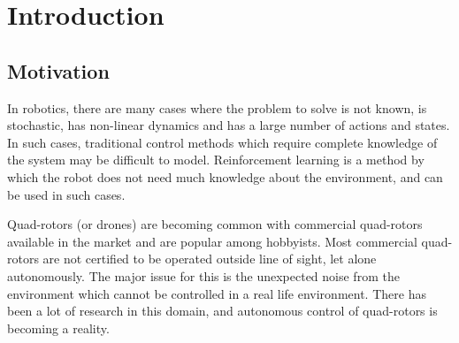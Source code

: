 \documentclass[BTech]{iitmdiss}
\begin{document}




\clearpage




\chapter{Introduction}

\section{Motivation}

In robotics, there are many cases where the problem to solve is not known, is stochastic, has non-linear dynamics and has a large number of actions and states. In such cases, traditional control methods which require complete knowledge of the system may be difficult to model. Reinforcement learning is a method by which the robot does not need much knowledge about the environment, and can be used in such cases.

Quad-rotors (or drones) are becoming common with commercial quad-rotors available in the market and are popular among hobbyists. Most commercial quad-rotors are not certified to be operated outside line of sight, let alone autonomously. The major issue for this is the unexpected noise from the environment which cannot be controlled in a real life environment. There has been a lot of research in this domain, and autonomous control of quad-rotors is becoming a reality.
\end{document}
